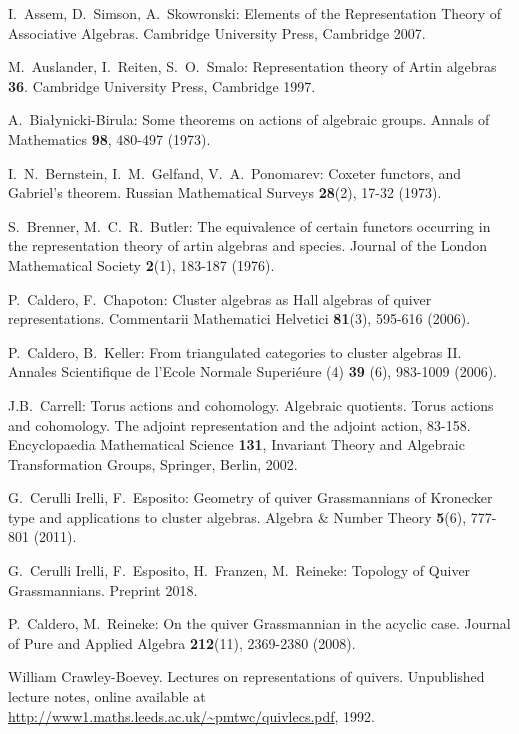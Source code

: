 \documentclass{amsart}
\numberwithin{equation}{section}
\begin{document}
\begin{thebibliography}{10}

  I.~Assem, D.~Simson, A.~Skowronski: Elements of the Representation Theory of Associative Algebras. Cambridge University Press, Cambridge 2007.

  M.~Auslander, I.~Reiten, S.~O.~Smalo: Representation theory of Artin algebras {\bf 36}. Cambridge University Press, Cambridge 1997.

  A.~Bia\l{}ynicki-Birula: Some theorems on actions of algebraic groups. Annals of Mathematics \textbf{98}, 480-497 (1973).

  I.~N.~Bernstein, I.~M.~Gelfand, V.~A.~Ponomarev: Coxeter functors, and Gabriel's theorem. Russian Mathematical Surveys \textbf{28}(2), 17-32 (1973).

  S.~Brenner, M.~C.~R.~Butler: The equivalence of certain functors occurring in the representation theory of artin algebras and species. Journal of the London Mathematical Society \textbf{2}(1), 183-187 (1976).

  P.~Caldero, F.~Chapoton: Cluster algebras as {H}all algebras of quiver representations. Commentarii Mathematici Helvetici \textbf{81}(3), 595-616 (2006).

  P.~Caldero, B.~Keller: From triangulated categories to cluster algebras II.  Annales Scientifique de l'Ecole Normale Superi\'{e}ure (4) \textbf{39} (6), 983-1009 (2006).

	J.B.~Carrell: Torus actions and cohomology. Algebraic quotients. Torus actions and cohomology. The adjoint representation and the adjoint action, 83-158. Encyclopaedia Mathematical Science \textbf{131}, Invariant Theory and Algebraic Transformation Groups, Springer, Berlin, 2002.

  G.~Cerulli Irelli, F.~Esposito: Geometry of quiver Grassmannians of Kronecker type and applications to cluster algebras. Algebra \&  Number Theory \textbf{5}(6), 777-801 (2011).

  G.~Cerulli Irelli, F.~Esposito, H.~Franzen, M.~Reineke: Topology of Quiver Grassmannians. Preprint 2018.

  P.~Caldero, M.~Reineke: On the quiver Grassmannian in the acyclic case. Journal of Pure and Applied Algebra \textbf{212}(11), 2369-2380 (2008).

William Crawley-Boevey. Lectures on representations of quivers. Unpublished lecture notes, online available at \url{http://www1.maths.leeds.ac.uk/~pmtwc/quivlecs.pdf}, 1992.
	


\end{thebibliography}
\end{document}
